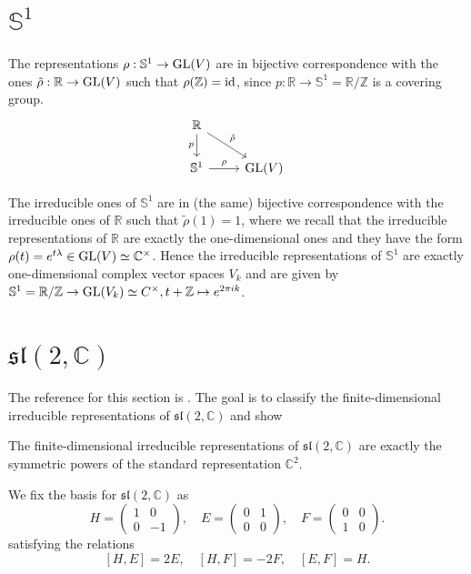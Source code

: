 \documentclass{report}
\begin{document}
\section{$\mathbb S^1$}
The representations $\rho:\mathbb S^1 \to \operatorname{{\mathrm{GL}}}(V)$ are in bijective correspondence with the ones $\tilde \rho: \mathbb R \to \operatorname{{\mathrm{GL}}}(V)$ such that $\rho(\mathbb Z) = \operatorname{id}$, since $p: \mathbb R \to \mathbb S^1 = \mathbb R / \mathbb Z$ is a covering group.
\[
    \begin{tikzcd}
        \mathbb R \arrow[dr, "\tilde \rho"] \arrow[d, "p"']  \\
        \mathbb S^1 \arrow[r, "\rho"] & \GL(V)
    \end{tikzcd}
\]

The irreducible ones of $\mathbb S^1$ are in (the same) bijective correspondence with the irreducible ones of $\mathbb R$ such that $\tilde \rho(1) = 1$, where we recall that the irreducible representations of $\mathbb R$ are exactly the one-dimensional ones and they have the form $\rho(t) = e^{t \lambda} \in \operatorname{{\mathrm{GL}}}(V) \simeq \mathbb C^{\times}$.
Hence the irreducible representations of $\mathbb S^1$ are exactly one-dimensional complex vector spaces $V_k$ and are given by $\mathbb S^1 = \mathbb R/ \mathbb Z \to \operatorname{{\mathrm{GL}}}(V_k) \simeq C^{\times}, t + \mathbb Z \mapsto e^{2 \pi i k }$.

\section{$\mathfrak{sl}(2, \mathbb C)$}
The reference for this section is \cite[Lecture 11.1]{fulton2013representation}.
The goal is to classify the finite-dimensional irreducible representations of $\mathfrak{sl}(2, \mathbb C)$ and show
\begin{theorem}\label{thm:irreducible_representations_of_sl_2_C}
    The finite-dimensional irreducible representations of $\mathfrak{sl}(2, \mathbb C)$ are exactly the symmetric powers of the standard representation $\mathbb C^2$.
\end{theorem}
We fix the basis for $\mathfrak{sl}(2, \mathbb C)$ as
\[
H = \begin{pmatrix} 1 & 0 \\ 0 & -1 \end{pmatrix}, \quad E = \begin{pmatrix} 0 & 1 \\ 0 & 0 \end{pmatrix}, \quad F = \begin{pmatrix} 0 & 0 \\ 1 & 0 \end{pmatrix}.
\]
satisfying the relations
\[
[H, E] = 2E, \quad [H, F] = -2F, \quad [E, F] = H.
\]
\end{document}
